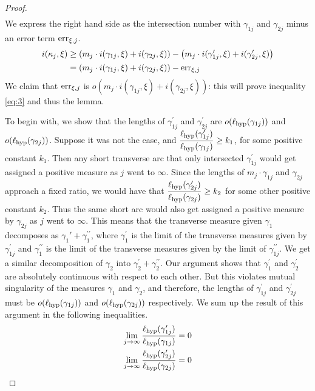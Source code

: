 \documentclass[12pt, reqno]{amsart}
\begin{document}
\begin{proof}
\begin{align}
  \end{align}
  We express the right hand side as the intersection number with $\gamma_{1j}$ and $\gamma_{2j}$ minus an error term $\mathrm{err}_{\xi, j}$.
  \begin{align*}
    i(\kappa_j, \xi) &\geq \left( m_j \cdot  i(\gamma_{1j}, \xi) + i(\gamma_{2j}, \xi)  \right)
    - \left( m_j \cdot  i(\gamma_{1j}^{\prime}, \xi) + i(\gamma_{2j}^{\prime}, \xi)  \right) \\
    &= \left( m_j \cdot  i(\gamma_{1j}, \xi) + i(\gamma_{2j}, \xi)  \right) - \mathrm{err}_{\xi, j}
  \end{align*}
  We claim that $\mathrm{err}_{\xi, j}$ is $o(m_j \cdot  i(\gamma_{1j}, \xi) + i(\gamma_{2j}, \xi))$: this will prove inequality \eqref{eq:3} and thus the lemma.

  To begin with, we show that the lengths of $\gamma_{1j}^{\prime}$ and $\gamma_{2j}^{\prime}$ are $o(\ell_{\mathrm{hyp}}(\gamma_{1j}))$ and $o(\ell_{\mathrm{hyp}}(\gamma_{2j}))$.
  Suppose it was not the case, and $\displaystyle \frac{\ell_{\mathrm{hyp}}(\gamma_{1j}^{\prime})}{\ell_{\mathrm{hyp}}(\gamma_{1j})} \geq k_1$, for some positive constant $k_1$.
  Then any short transverse arc that only intersected $\gamma_{1j}^{\prime}$ would get assigned a positive measure as $j$ went to $\infty$.
  Since the lengths of $m_j \cdot \gamma_{1j}$ and $\gamma_{2j}$ approach a fixed ratio, we would have that $\displaystyle \frac{\ell_{\mathrm{hyp}}(\gamma_{2j}^{\prime})}{\ell_{\mathrm{hyp}}(\gamma_{2j})} \geq k_2$ for some other positive constant $k_2$.
  Thus the same short arc would also get assigned a positive measure by $\gamma_{2j}$ as $j$ went to $\infty$.
  This means that the transverse measure given $\gamma_1$ decomposes as $\gamma_1{\prime} + \gamma_1^{\prime \prime}$, where $\gamma_1^{\prime}$ is the limit of the transverse measures given by $\gamma_{1j}^{\prime}$ and $\gamma_1^{\prime \prime}$ is the limit of the transverse measures given by the limit of $\gamma_{1j}^{\prime \prime}$.
  We get a similar decomposition of $\gamma_2$ into $\gamma_2^{\prime} + \gamma_2^{\prime \prime}$.
  Our argument shows that $\gamma_{1}^{\prime}$ and $\gamma_2^{\prime}$ are absolutely continuous with respect to each other.
  But this violates mutual singularity of the measures $\gamma_1$ and $\gamma_2$, and therefore, the lengths of $\gamma_{1j}^{\prime}$ and $\gamma_{2j}^{\prime}$ must be $o(\ell_{\mathrm{hyp}}(\gamma_{1j}))$ and $o(\ell_{\mathrm{hyp}}(\gamma_{2j}))$ respectively.
  We sum up the result of this argument in the following inequalities.
  \begin{align}
    \label{eq:5}
    \lim_{j \to \infty} \frac{\ell_{\mathrm{hyp}}(\gamma_{1j}^{\prime})}{\ell_{\mathrm{hyp}}(\gamma_{1j})} &= 0 \\
    \label{eq:6}
    \lim_{j \to \infty} \frac{\ell_{\mathrm{hyp}}(\gamma_{2j}^{\prime})}{\ell_{\mathrm{hyp}}(\gamma_{2j})} &= 0 \\
  \end{align}


\end{proof}
\end{document}
